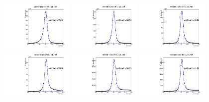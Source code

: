 \documentclass[thesis.tex]{subfiles}
\renewcommand\_{\textunderscore\allowbreak}
\begin{document}
\begin{figure}[hbtp]
  \centering
   \includegraphics[width=0.31\textwidth]{Figures/Bw_ker_pt_den_35_40.pdf}  \includegraphics[width=0.31\textwidth]{Figures/Bw_ker_pt_den_40_45.pdf} \includegraphics[width=0.31\textwidth]{Figures/Bw_ker_pt_den_45_50.pdf} \\
  \includegraphics[width=0.31\textwidth]{Figures/Bw_ker_pt_den_50_55.pdf}   \includegraphics[width=0.31\textwidth]{Figures/Bw_ker_pt_den_55_60.pdf}  \includegraphics[width=0.31\textwidth]{Figures/Bw_ker_pt_den_60_65.pdf}\\

\end{figure}
\end{document}
